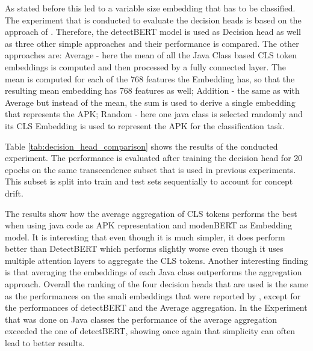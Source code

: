 As stated before this led to a variable size embedding that
has to be classified.
The experiment that is conducted to evaluate the decision heads is based on 
the approach of \cite{detectbert}. Therefore, the detectBERT model is used as 
Decision head as well as three other simple approaches and their performance 
is compared.
The other approaches are: Average - here the mean of all the Java Class based
CLS token embeddings is computed and then processed by a fully connected layer.
The mean is computed for each of the 768 features the Embedding has, so that the
resulting mean embedding has 768 features as well;
Addition - the same as with Average but instead of the mean, the sum is used to
derive a single embedding that represents the APK;
Random - here one java class is selected randomly and its CLS Embedding is used to 
represent the APK for the classification task.

Table \ref{tab:decision_head_comparison} shows the results of the conducted experiment.
The performance is evaluated after training the decision head for 20 epochs on 
the same transcendence subset that is used in previous experiments. This subset 
is split into train and test sets sequentially to account for concept drift.

The results show how the average aggregation of CLS tokens performs the best when
using java code as APK representation and modenBERT as Embedding model.
It is interesting that even though it is much simpler, it does perform better than
DetectBERT which performs slightly worse even though it uses multiple attention
layers to aggregate the CLS tokens.
Another interesting finding is that averaging the embeddings of each Java class 
outperforms the aggregation approach. 
Overall the ranking of the four decision heads that are used is the same as the 
performances on the smali embeddings that were reported by \cite{detectbert}, except
for the performances of detectBERT and the Average aggregation. 
In the Experiment that was done on Java classes the performance of the average
aggregation exceeded the one of detectBERT, showing once again that simplicity 
can often lead to better results.

\begin{table}[b] 
    \caption{\label{tab:decision_head_comparison}%
    Performance comparison of different decision heads on the Transcend dataset with a time-based split.}
\end{table}


